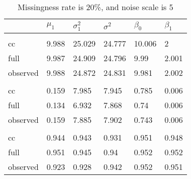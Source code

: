 \documentclass[
  twocolumn]{article}
\begin{document}
\begin{table}[h]
\caption{Missingness rate is 20\%, and noise scale is 5}
\begingroup\fontsize{7}{9}\selectfont

\begin{tabu} to 
\toprule
 & $\mu_1$ & $\sigma^2_1$ & $\sigma^2$ & $\beta_0$ & $\beta_1$\\
\midrule
\addlinespace[0.3em]
\\
\hspace{1em}cc & 9.988 & 25.029 & 24.777 & 10.006 & 2\\
\hspace{1em}full & 9.987 & 24.909 & 24.796 & 9.99 & 2.001\\
\hspace{1em}observed & 9.988 & 24.872 & 24.831 & 9.981 & 2.002\\
\addlinespace[0.3em]
\\
\hspace{1em}cc & 0.159 & 7.985 & 7.945 & 0.785 & 0.006\\
\hspace{1em}full & 0.134 & 6.932 & 7.868 & 0.74 & 0.006\\
\hspace{1em}observed & 0.159 & 7.885 & 7.902 & 0.743 & 0.006\\
\addlinespace[0.3em]
\\
\hspace{1em}cc & 0.944 & 0.943 & 0.931 & 0.951 & 0.948\\
\hspace{1em}full & 0.951 & 0.945 & 0.94 & 0.952 & 0.952\\
\hspace{1em}observed & 0.923 & 0.928 & 0.942 & 0.952 & 0.951\\
\bottomrule
\end{tabu}
\endgroup{}
\end{table}
\end{document}
